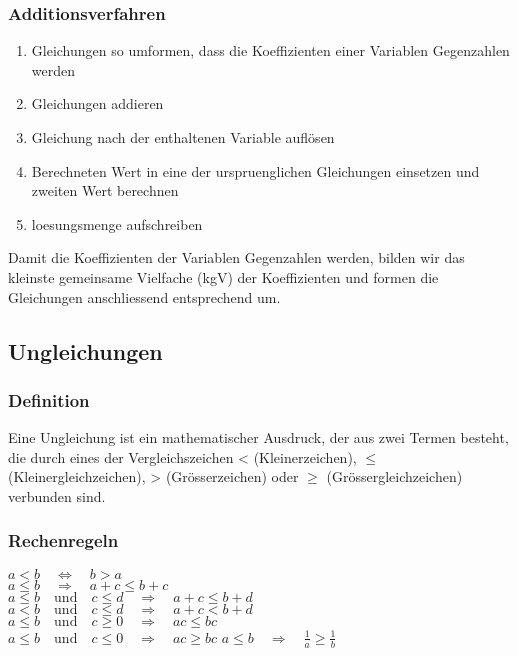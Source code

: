 \begin{multicols}{2}
    \subsubsection{Additionsverfahren}
    \vspace{-4mm}
    \begin{enumerate}
        \item     Gleichungen so umformen, dass die Koeffizienten einer Variablen Gegenzahlen werden
        \item     Gleichungen addieren
        \item     Gleichung nach der enthaltenen Variable auflösen
        \item     Berechneten Wert in eine der urspruenglichen Gleichungen einsetzen und zweiten Wert berechnen
        \item     loesungsmenge aufschreiben
    \end{enumerate}
    Damit die Koeffizienten der Variablen Gegenzahlen werden, bilden wir das kleinste gemeinsame Vielfache (kgV) der Koeffizienten und formen die Gleichungen anschliessend entsprechend um.

    \subsection{Ungleichungen}
    \vspace{-4mm}
    \subsubsection{Definition}
    \vspace{-4mm}
    Eine Ungleichung ist ein mathematischer Ausdruck, der aus zwei Termen besteht, die durch eines der Vergleichszeichen < (Kleinerzeichen), $\leq$ (Kleinergleichzeichen),
    > (Grösserzeichen) oder $\geq$ (Grössergleichzeichen) verbunden sind.

    \subsubsection{Rechenregeln}
    \vspace{-4mm}
    $ a < b \quad \Longleftrightarrow \quad b > a$\\
    $a \leq b \quad \Rightarrow \quad a+c \leq b+c$\\
    $a \leq b \quad\text{und}\quad c \leq d \quad \Rightarrow \quad a+c \leq b+d$\\
    $a < b \quad\text{und}\quad c \leq d \quad \Rightarrow \quad a+c < b+d$\\
    $a \leq b \quad\text{und}\quad c \geq 0 \quad \Rightarrow \quad ac \leq bc$\\
    $a \leq b \quad\text{und}\quad c \leq 0 \quad \Rightarrow \quad ac \geq bc$
    $a \leq b \quad \Rightarrow \quad \frac{1}{a} \geq \frac{1}{b}$ \\

\end{multicols}
